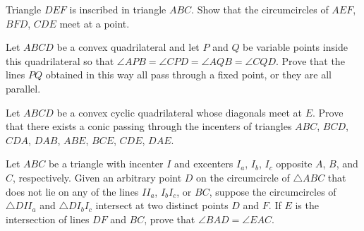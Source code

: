 \documentclass[11pt]{scrartcl}
\begin{document}
\begin{problem}
  Triangle $DEF$ is inscribed in triangle $ABC$.
  Show that the circumcircles of $AEF$, $BFD$, $CDE$ meet at a point.
\end{problem}

\begin{problem}
  Let $ABCD$ be a convex quadrilateral and let $P$ and $Q$ be variable points
  inside this quadrilateral so that $\angle APB=\angle CPD=\angle AQB=\angle CQD$.
  Prove that the lines $PQ$ obtained in this way all pass through a fixed point,
  or they are all parallel.
\end{problem}

\begin{problem}
  Let $ABCD$ be a convex cyclic quadrilateral whose diagonals meet at $E$.
  Prove that there exists a conic passing through the incenters of triangles
  $ABC$, $BCD$, $CDA$, $DAB$, $ABE$, $BCE$, $CDE$, $DAE$.
\end{problem}

\begin{problem}
Let $ABC$ be a triangle with incenter $I$
and excenters $I_a$, $I_b$, $I_c$ opposite $A$, $B$, and $C$, respectively.
Given an arbitrary point $D$ on the circumcircle of $\triangle ABC$
that does not lie on any of the lines $II_a$, $I_bI_c$, or $BC$,
suppose the circumcircles of $\triangle DII_a$ and $\triangle DI_bI_c$
intersect at two distinct points $D$ and $F$.
If $E$ is the intersection of lines $DF$ and $BC$,
prove that $\angle BAD = \angle EAC$.
\end{problem}
\end{document}
